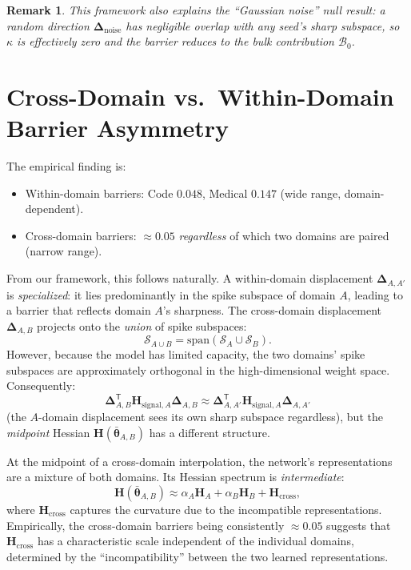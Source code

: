 \documentclass{article}
\newtheorem{remark}{Remark}
\newcommand{\Hess}{\mathbf{H}}
\newcommand{\btheta}{\bm{\theta}}
\newcommand{\bDelta}{\bm{\Delta}}
\begin{document}
\begin{remark}
This framework also explains the ``Gaussian noise'' null result: a random direction
$\bDelta_{\mathrm{noise}}$ has negligible overlap with \emph{any} seed's sharp subspace,
so $\kappa$ is effectively zero and the barrier reduces to the bulk contribution $\mathcal{B}_0$.
\end{remark}

\section{Cross-Domain vs.\ Within-Domain Barrier Asymmetry}

The empirical finding is:
\begin{itemize}
\item Within-domain barriers: Code $0.048$, Medical $0.147$ (wide range, domain-dependent).
\item Cross-domain barriers: $\approx0.05$ \emph{regardless} of which two domains are paired (narrow range).
\end{itemize}

From our framework, this follows naturally. A within-domain displacement $\bDelta_{A,A'}$ is
\emph{specialized}: it lies predominantly in the spike subspace of domain $A$, leading to
a barrier that reflects domain $A$'s sharpness. The cross-domain displacement
$\bDelta_{A,B}$ projects onto the \emph{union} of spike subspaces:
\begin{equation}
\mathcal{S}_{A\cup B} = \mathrm{span}(\mathcal{S}_A \cup \mathcal{S}_B).
\end{equation}
However, because the model has limited capacity, the two domains' spike subspaces
are approximately orthogonal in the high-dimensional weight space. Consequently:
\begin{equation}
\bDelta_{A,B}^{\mathsf T}\Hess_{\mathrm{signal},A}\bDelta_{A,B}
\approx \bDelta_{A,A'}^{\mathsf T}\Hess_{\mathrm{signal},A}\bDelta_{A,A'}
\end{equation}
(the $A$-domain displacement sees its own sharp subspace regardless), but the \emph{midpoint}
Hessian $\Hess(\bar{\btheta}_{A,B})$ has a different structure.

At the midpoint of a cross-domain interpolation, the network's representations are a mixture
of both domains. Its Hessian spectrum is \emph{intermediate}:
\begin{equation}
\Hess(\bar{\btheta}_{A,B}) \approx \alpha_A\Hess_A + \alpha_B\Hess_B + \Hess_{\mathrm{cross}},
\end{equation}
where $\Hess_{\mathrm{cross}}$ captures the curvature due to the incompatible representations.
Empirically, the cross-domain barriers being consistently $\approx0.05$ suggests that
$\Hess_{\mathrm{cross}}$ has a characteristic scale independent of the individual domains,
determined by the ``incompatibility'' between the two learned representations.
\end{document}
